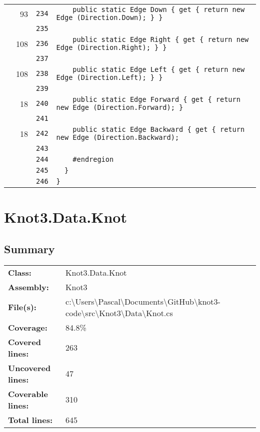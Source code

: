 \documentclass[a4paper,10pt]{article}
\begin{document}
\begin{longtable}[l]{lrrl}
\cellcolor{green} & 93 & \verb~234~ & \verb~    public static Edge Down { get { return new Edge (Direction.Down); } }~\\
\cellcolor{gray} &  & \verb~235~ & \verb~~\\
\cellcolor{green} & 108 & \verb~236~ & \verb~    public static Edge Right { get { return new Edge (Direction.Right); } }~\\
\cellcolor{gray} &  & \verb~237~ & \verb~~\\
\cellcolor{green} & 108 & \verb~238~ & \verb~    public static Edge Left { get { return new Edge (Direction.Left); } }~\\
\cellcolor{gray} &  & \verb~239~ & \verb~~\\
\cellcolor{green} & 18 & \verb~240~ & \verb~    public static Edge Forward { get { return new Edge (Direction.Forward); } ~\\
\cellcolor{gray} &  & \verb~241~ & \verb~~\\
\cellcolor{green} & 18 & \verb~242~ & \verb~    public static Edge Backward { get { return new Edge (Direction.Backward); ~\\
\cellcolor{gray} &  & \verb~243~ & \verb~~\\
\cellcolor{gray} &  & \verb~244~ & \verb~    #endregion~\\
\cellcolor{gray} &  & \verb~245~ & \verb~  }~\\
\cellcolor{gray} &  & \verb~246~ & \verb~}~\\
\end{longtable}
\newpage
\section{Knot3.Data.Knot}
\subsection{Summary}
\begin{longtable}[l]{ll}
\textbf{Class:} & Knot3.Data.Knot\\
\textbf{Assembly:} & Knot3\\
\textbf{File(s):} & \begin{minipage}[t]{12cm}{c:\textbackslash Users\textbackslash Pascal\textbackslash Documents\textbackslash GitHub\textbackslash knot3-code\textbackslash src\textbackslash Knot3\textbackslash Data\textbackslash Knot.cs}\end{minipage} \\
\textbf{Coverage:} & 84.8\%\\
\textbf{Covered lines:} & 263\\
\textbf{Uncovered lines:} & 47\\
\textbf{Coverable lines:} & 310\\
\textbf{Total lines:} & 645\\
\end{longtable}
\end{document}
